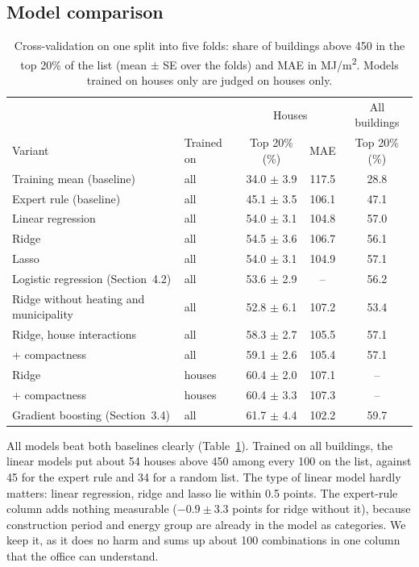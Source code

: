 \documentclass[11pt,a4paper]{article}
\begin{document}
\subsection{Model comparison}
\begin{table}[ht]
\centering\small
\begin{tabular}{llccc}
\toprule
 & & \multicolumn{2}{c}{Houses} & All buildings \\
Variant & Trained on & Top 20\% (\%) & MAE & Top 20\% (\%) \\
\midrule
Training mean (baseline) & all & 34.0 $\pm$ 3.9 & 117.5 & 28.8 \\
Expert rule (baseline)   & all & 45.1 $\pm$ 3.5 & 106.1 & 47.1 \\
\midrule
Linear regression & all & 54.0 $\pm$ 3.1 & 104.8 & 57.0 \\
Ridge             & all & 54.5 $\pm$ 3.6 & 106.7 & 56.1 \\
Lasso             & all & 54.0 $\pm$ 3.1 & 104.9 & 57.1 \\
Logistic regression (Section~4.2) & all & 53.6 $\pm$ 2.9 & -- & 56.2 \\
\midrule
Ridge without heating and municipality & all & 52.8 $\pm$ 6.1 & 107.2 & 53.4 \\
\midrule
Ridge, house interactions         & all & 58.3 $\pm$ 2.7 & 105.5 & 57.1 \\
\quad + compactness               & all & 59.1 $\pm$ 2.6 & 105.4 & 57.1 \\
Ridge                             & houses & 60.4 $\pm$ 2.0 & 107.1 & -- \\
\quad + compactness               & houses & 60.4 $\pm$ 3.3 & 107.3 & -- \\
Gradient boosting (Section~3.4)   & all & 61.7 $\pm$ 4.4 & 102.2 & 59.7 \\
\bottomrule
\end{tabular}
\caption{Cross-validation on one split into five folds: share of buildings above 450 in the top 20\% of the
list (mean $\pm$ SE over the folds) and MAE in MJ/m\textsuperscript{2}. Models trained on houses only are
judged on houses only.}
\label{tab:models}
\end{table}

All models beat both baselines clearly (Table~\ref{tab:models}). Trained on all buildings, the linear models
put about 54 houses above 450 among every 100 on the list, against 45 for the expert rule and 34 for a random
list. The type of linear model hardly matters: linear regression, ridge and lasso lie within 0.5 points.
The expert-rule column adds nothing measurable ($-0.9 \pm 3.3$ points for ridge without it), because
construction period and energy group are already in the model as categories. We keep it, as it does no harm
and sums up about 100 combinations in one column that the office can understand.
\end{document}
